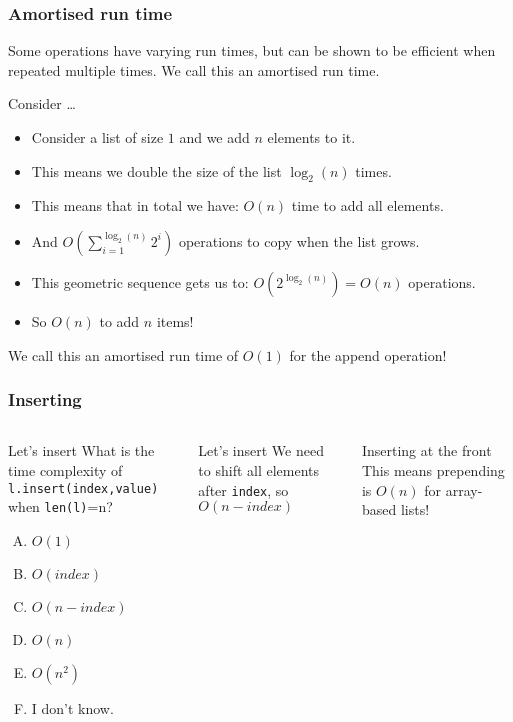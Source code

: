 \begin{frame}
	\frametitle{Amortised run time}
		Some operations have varying run times, but can be shown to be efficient when repeated multiple times. We call
		this an amortised run time.
	
Consider \ldots
		\begin{itemize}
			\item Consider a list of size $1$ and we add $n$ elements to it.
			\item This means we double the size of the list $\log_2(n)$ times.
			\item This means that in total we have: $O(n)$ time to add all elements.
			\item And $O\left(\sum\limits_{i=1}^{\log_2(n)} 2^i\right)$ operations to copy when the list grows.
			\item This geometric sequence gets us to: $O(2^{\log_2(n)}) = O(n)$ operations.
			\item So $O(n)$ to add $n$ items!
		\end{itemize}
		
		We call this an amortised run time of $O(1)$ for the append operation!
\end{frame}

\begin{frame}
	\frametitle{Inserting}
	\begin{columns}

		\begin{block}{Let's insert}
			What is the time complexity of \texttt{l.insert(index,value)} when \texttt{len(l)}=n?
			\begin{enumerate}[A.]
				\item $O(1)$
				\item $O(\textit{index})$
				\item $O(n - \textit{index})$
				\item $O(n)$
				\item $O(n^2)$
				\item I don't know.
			\end{enumerate}
		\end{block}
		
		\begin{block}{Let's insert}
			We need to shift all elements after \texttt{index}, so $O(n-\textit{index})$
		\end{block}
		
		\begin{block}{Inserting at the front}
			This means prepending is $O(n)$ for array-based lists!
		\end{block}	
	\end{columns}
\end{frame}

